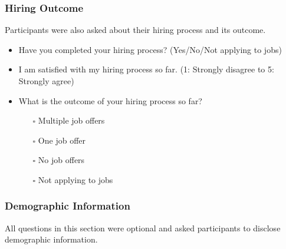 \subsubsection{Hiring Outcome}
Participants were also asked about their hiring process and its outcome.
\begin{itemize}
\item Have you completed your hiring process? (Yes/No/Not applying to jobs)
\item I am satisfied with my hiring process so far. (1: Strongly disagree to 5: Strongly agree)
\item What is the outcome of your hiring process so far? 
    \begin{itemize}
        \item[$\square$] Multiple job offers
        \item[$\square$] One job offer
        \item[$\square$] No job offers
        \item[$\square$] Not applying to jobs
    \end{itemize}
\end{itemize}

\subsubsection{Demographic Information}
All questions in this section were optional and asked participants to disclose demographic information.

